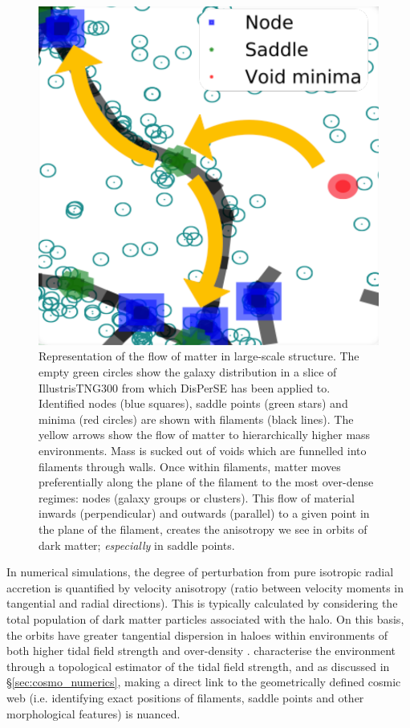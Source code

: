 \begin{figure}
    \centering
	\includegraphics[width=0.5\linewidth]{thesis/latex/dyn_mod_files/disperse_matter_path.pdf}
    \caption{Representation of the flow of matter in large-scale structure. The empty green circles show the galaxy distribution in a slice of IllustrisTNG300 from which DisPerSE has been applied to. Identified nodes (blue squares), saddle points (green stars) and minima (red circles) are shown with filaments (black lines). The yellow arrows show the flow of matter to hierarchically higher mass environments. Mass is sucked out of voids which are funnelled into filaments through walls. Once within filaments, matter moves preferentially along the plane of the filament to the most over-dense regimes: nodes (galaxy groups or clusters). This flow of material inwards (perpendicular) and outwards (parallel) to a given point in the plane of the filament, creates the anisotropy we see in orbits of dark matter; \textit{especially} in saddle points.}
    \label{fig:disperse_matter_path}
\end{figure}

In numerical simulations, the degree of perturbation from pure isotropic radial accretion is quantified by velocity anisotropy (ratio between velocity moments in tangential and radial directions). This is typically calculated by considering the total population of dark matter particles associated with the halo. On this basis, the orbits have greater tangential dispersion in haloes within environments of both higher tidal field strength and over-density \citep[e.g.][]{faltenbacher2010, shi2015}. \citet{shi2015} characterise the environment through a topological estimator of the tidal field strength, and as discussed in \S\ref{sec:cosmo_numerics}, making a direct link to the geometrically defined cosmic web (i.e. identifying exact positions of filaments, saddle points and other morphological features) is nuanced.  

